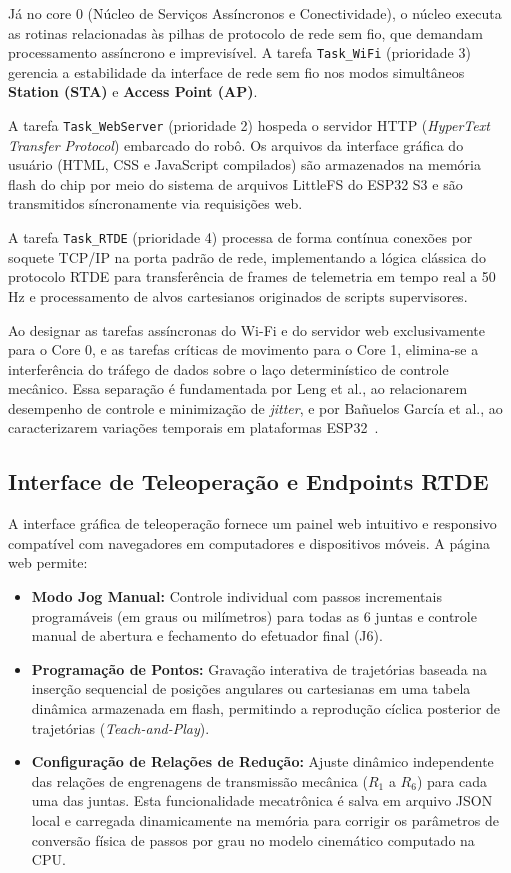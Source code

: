 Já no core 0 (Núcleo de Serviços Assíncronos e Conectividade), o núcleo executa as rotinas relacionadas às pilhas de protocolo de rede sem fio, que demandam processamento assíncrono e imprevisível. A tarefa \texttt{Task\_WiFi} (prioridade 3) gerencia a estabilidade da interface de rede sem fio nos modos simultâneos \textbf{Station (STA)} e \textbf{Access Point (AP)}. 
    
A tarefa \texttt{Task\_WebServer} (prioridade 2) hospeda o servidor HTTP (\textit{HyperText Transfer Protocol}) embarcado do robô. Os arquivos da interface gráfica do usuário (HTML, CSS e JavaScript compilados) são armazenados na memória flash do chip por meio do sistema de arquivos LittleFS do ESP32 S3 e são transmitidos síncronamente via requisições web. 
    
A tarefa \texttt{Task\_RTDE} (prioridade 4) processa de forma contínua conexões por soquete TCP/IP na porta padrão de rede, implementando a lógica clássica do protocolo RTDE para transferência de frames de telemetria em tempo real a 50\,Hz e processamento de alvos cartesianos originados de scripts supervisores.


Ao designar as tarefas assíncronas do Wi-Fi e do servidor web exclusivamente para o Core 0, e as tarefas críticas de movimento para o Core 1, elimina-se a interferência do tráfego de dados sobre o laço determinístico de controle mecânico. Essa separação é fundamentada por Leng et al., ao relacionarem desempenho de controle e minimização de \textit{jitter}, e por Bañuelos García et al., ao caracterizarem variações temporais em plataformas ESP32~\cite{leng2014improving, banuelos2026timing}.

\subsection{Interface de Teleoperação e Endpoints RTDE}
\label{subsec:interface_rtde}

A interface gráfica de teleoperação fornece um painel web intuitivo e responsivo compatível com navegadores em computadores e dispositivos móveis. A página web permite:
\begin{itemize}
    \item \textbf{Modo Jog Manual:} Controle individual com passos incrementais programáveis (em graus ou milímetros) para todas as 6 juntas e controle manual de abertura e fechamento do efetuador final (J6).
    \item \textbf{Programação de Pontos:} Gravação interativa de trajetórias baseada na inserção sequencial de posições angulares ou cartesianas em uma tabela dinâmica armazenada em flash, permitindo a reprodução cíclica posterior de trajetórias (\textit{Teach-and-Play}).
    \item \textbf{Configuração de Relações de Redução:} Ajuste dinâmico independente das relações de engrenagens de transmissão mecânica ($R_1$ a $R_6$) para cada uma das juntas. Esta funcionalidade mecatrônica é salva em arquivo JSON local e carregada dinamicamente na memória para corrigir os parâmetros de conversão física de passos por grau no modelo cinemático computado na CPU.
\end{itemize}

